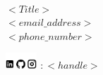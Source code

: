 \documentclass{article}
\begin{document}
\vspace*{\fill}

{\bf\Large
  \\
  \noindent $<Title>$\\
  \noindent $<email\_address>$\\
  \noindent $<phone\_number>$
  
  \noindent \includegraphics[height=0.6cm]{logos_linkedin_github_instagram_icons.png}
  :\,$<handle>$
}
\end{document}
